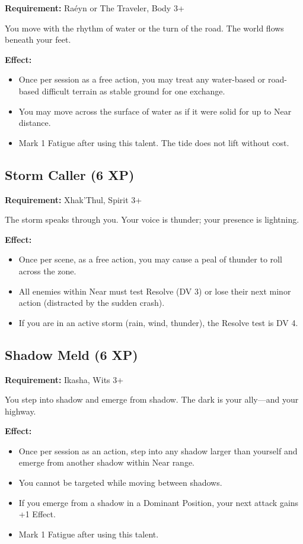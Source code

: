 \textbf{Requirement:} Raéyn or The Traveler, Body 3+

You move with the rhythm of water or the turn of the road. The world flows beneath your feet.

\textbf{Effect:}
\begin{itemize}
\item Once per session as a free action, you may treat any water-based or road-based difficult terrain as stable ground for one exchange.
\item You may move across the surface of water as if it were solid for up to Near distance.
\item Mark 1 Fatigue after using this talent. The tide does not lift without cost.
\end{itemize}

\subsection{Storm Caller (6 XP)}

\textbf{Requirement:} Xhak'Thul, Spirit 3+

The storm speaks through you. Your voice is thunder; your presence is lightning.

\textbf{Effect:}
\begin{itemize}
\item Once per scene, as a free action, you may cause a peal of thunder to roll across the zone.
\item All enemies within Near must test Resolve (DV 3) or lose their next minor action (distracted by the sudden crash).
\item If you are in an active storm (rain, wind, thunder), the Resolve test is DV 4.
\end{itemize}

\subsection{Shadow Meld (6 XP)}

\textbf{Requirement:} Ikasha, Wits 3+

You step into shadow and emerge from shadow. The dark is your ally—and your highway.

\textbf{Effect:}
\begin{itemize}
\item Once per session as an action, step into any shadow larger than yourself and emerge from another shadow within Near range.
\item You cannot be targeted while moving between shadows.
\item If you emerge from a shadow in a Dominant Position, your next attack gains +1 Effect.
\item Mark 1 Fatigue after using this talent.
\end{itemize}

